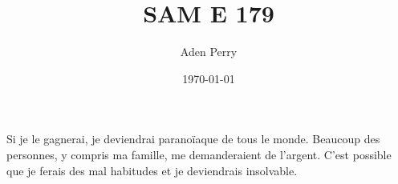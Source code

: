 \documentclass{article}
\title{SAM E 179}
\author{Aden Perry}
\date{\today}
\begin{document}
\maketitle

Si je le gagnerai, je deviendrai paranoïaque de tous le monde. Beaucoup des
personnes, y compris ma famille, me demanderaient de l'argent. C'est possible
que je ferais des mal habitudes et je deviendrais insolvable.
\end{document}
